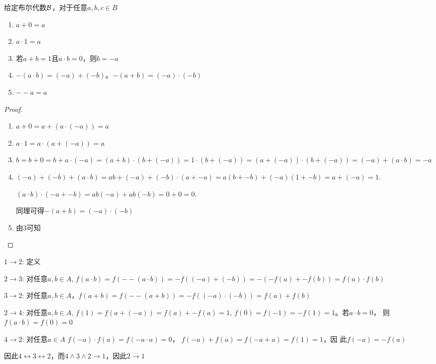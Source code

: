 \documentclass[11pt]{article}
\begin{document}
\begin{lemma}[]
给定布尔代数\(\mathcal{B}\)，对于任意\(a,b,c\in B\)
\begin{enumerate}
\item \(a+0=a\)
\item \(a\cdot 1=a\)
\item 若\(a+b=1\)且\(a\cdot b=0\)，则\(b=-a\)
\item \(-(a\cdot b)=(-a)+(-b)\)。\(-(a+b)=(-a)\cdot(-b)\)
\item \(--a=a\)
\end{enumerate}
\end{lemma}

\begin{proof}
\begin{enumerate}
\item \(a+0=a+(a\cdot(-a))=a\)
\item \(a\cdot 1=a\cdot(a+(-a))=a\)
\item \(b=b+0=b+a\cdot(-a)=(a+b)\cdot(b+(-a))=1\cdot(b+(-a))=(a+(-a))\cdot(b+(-a))=(-a)+(a\cdot b)=-a\)
\item \((-a)+(-b)+(a\cdot b)=ab+(-a)+(-b)\cdot(a+-a)=a(b+-b)+(-a)(1+-b)=a+(-a)=1\).

\((a\cdot b)\cdot(-a+-b)=ab(-a)+ab(-b)=0+0=0\).

同理可得\(-(a+b)=(-a)\cdot(-b)\)
\item 由3可知
\end{enumerate}
\end{proof}

\begin{exercise}[1.1.10]
\(1\to 2\): 定义

\(2\to 3\): 对任意\(a,b\in A\),  \(f(a\cdot b)=f(--(a\cdot b))=-f((-a)+(-b))=-(-f(a)+-f(b))=f(a)\cdot f(b)\)

\(3\to 2\): 对任意\(a,b\in A\)，\(f(a+b)=f(--(a+b))=-f((-a)\cdot(-b))=f(a)+f(b)\)

\(2\to 4\): 对任意\(a,b\in A\), \(f(1)=f(a+(-a))=f(a)+-f(a)=1\), \(f(0)=f(-1)=-f(1)=1\)。若\(a\cdot b=0\)，
则\(f(a\cdot b)=f(0)=0\)

\(4\to 2\): 对任意\(a\in A\) \(f(-a)\cdot f(a)=f(-a\cdot a)=0\)， \(f(-a)+f(a)=f(-a+a)=f(1)=1\)，因
此\(f(-a)=-f(a)\)

因此\(4\leftrightarrow 3\leftrightarrow 2\)，而\(4\wedge 3\wedge 2\to 1\)，因此\(2\to 1\)
\end{exercise}
\end{document}
